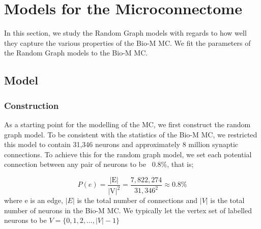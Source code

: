 \section{Models for the Microconnectome}
In this section, we study the Random Graph models with regards to how well they capture the various properties of the Bio-M MC. We fit the parameters of the Random Graph models to the Bio-M MC.
\subsection{\ER Model}
\subsubsection{Construction}
As a starting point for the modelling of the MC, we first construct the \ER random graph model. To be consistent with the statistics of the Bio-M MC, we restricted this model to contain 31,346 neurons and approximately 8 million synaptic connections. To achieve this for the \ER random graph model, we set each potential connection between any pair of neurons to be ~0.8\%, that is;

\begin{equation}
    P(e) =\frac{|\textrm{E}|}{|\textrm{V}|^{2}} = \frac{7,822,274}{31,346^2} \approx 0.8\%
\end{equation}
where e is an edge, $|E|$ is the total number of connections and $|V|$ is the total number of neurons in the Bio-M MC. We typically let the vertex set of labelled neurons to be $V = \{0, 1, 2, \dots, |V|-1\}$

\begin{algorithm}[H]
\SetAlgoLined
{}
\Input{Vertex Set V, $p \leftarrow 0.008$, random number generator \textit{r} $\in[0, 1)$}
\caption{$\mathcal{G_{ER}} (V, p, r)$}
\end{algorithm}

